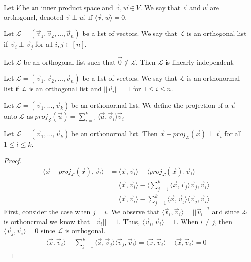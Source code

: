 \begin{definition}
    Let $V$ be an inner product space and $\vec{v},\vec{w}\in V$. We say that $\vec{v}$ and $\vec{w}$ are orthogonal, denoted $\vec{v}\perp\vec{w}$, if $\langle\vec{v},\vec{w}\rangle=0$.
\end{definition}
\begin{definition}
    Let $\mathcal{L}=(\vec{v}_1,\vec{v}_2,\ldots,\vec{v}_n)$ be a list of vectors. We say that $\mathcal{L}$ is an orthogonal list if $\vec{v}_i\perp\vec{v}_j$ for all $i,j\in [n]$.
\end{definition}
\begin{theorem}
    Let $\mathcal{L}$ be an orthogonal list such that $\vec{0}\notin \mathcal{L}$. Then $\mathcal{L}$ is linearly independent.
\end{theorem}
\begin{definition}
    Let $\mathcal{L}=(\vec{v}_1,\vec{v}_2,\ldots,\vec{v}_n)$ be a list of vectors. We say that $\mathcal{L}$ is an orthonormal list if $\mathcal{L}$ is an orthogonal list and $||\vec{v}_i||=1$ for $1\leq i\leq n$.
\end{definition}
\begin{definition}
    Let $\mathcal{L}=(\vec{v}_1,\ldots,\vec{v}_k)$ be an orthonormal list. We define the projection of a $\vec{u}$ onto $\mathcal{L}$ as $proj_\mathcal{L}(\vec{u})=\sum_{i=1}^k\langle\vec{u},\vec{v}_i\rangle\vec{v}_i$
\end{definition}
\begin{theorem}
    Let $\mathcal{L}=(\vec{v}_1,\ldots,\vec{v}_k)$ be an orthonormal list. Then $\vec{x}-proj_\mathcal{L}(\vec{x})\perp \vec{v}_i$ for all $1\leq i\leq k$.
\end{theorem}
\begin{proof}
    \begin{align*}
        \langle \vec{x}-proj_\mathcal{L}(\vec{x}), \vec{v}_i\rangle&=\langle\vec{x},\vec{v}_i\rangle-\langle proj_\mathcal{L}(\vec{x}),\vec{v}_i\rangle\tag{by Linearity}\\
        &=\langle\vec{x},\vec{v}_i\rangle-\langle\sum_{j=1}^k\langle\vec{x},\vec{v}_j\rangle\vec{v}_j,\vec{v}_i\rangle\\
        &=\langle\vec{x},\vec{v}_i\rangle-\sum_{j=1}^k\langle\vec{x},\vec{v}_j\rangle\langle\vec{v}_j,\vec{v}_i\rangle\tag{by Linearity}
    \end{align*}
    First, consider the case when $j=i$. We observe that $\langle\vec{v}_i,\vec{v}_i\rangle=||\vec{v}_i||^2$ and since $\mathcal{L}$ is orthonormal we know that $||\vec{v}_i||=1$. Thus, $\langle\vec{v}_i,\vec{v}_i\rangle=1$. When $i\neq j$, then $\langle\vec{v}_j,\vec{v}_i\rangle=0$ since $\mathcal{L}$ is orthogonal.
    \begin{align*}
        \langle\vec{x},\vec{v}_i\rangle-\sum_{j=1}^k\langle\vec{x},\vec{v}_j\rangle\langle\vec{v}_j,\vec{v}_i\rangle=\langle\vec{x},\vec{v}_i\rangle-\langle\vec{x},\vec{v}_i\rangle=0
    \end{align*}
\end{proof}
